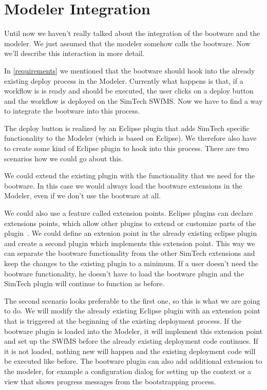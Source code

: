 \section{Modeler Integration}
\label{eclipse}

Until now we haven't really talked about the integration of the bootware and the modeler.
We just assumed that the modeler somehow calls the bootware.
Now we'll describe this interaction in more detail.

In \autoref{requirements} we mentioned that the bootware should hook into the already existing deploy process in the Modeler.
Currently what happens is that, if a workflow is is ready and should be executed, the user clicks on a deploy button and the workflow is deployed on the SimTech SWfMS.
Now we have to find a way to integrate the bootware into this process.

The deploy button is realized by an Eclipse plugin that adds SimTech specific functionality to the Modeler (which is based on Eclipse).
We therefore also have to create some kind of Eclipse plugin to hook into this process.
There are two scenarios how we could go about this.

We could extend the existing plugin with the functionality that we need for the bootware.
In this case we would always load the bootware extensions in the Modeler, even if we don't use the bootware at all.

We could also use a feature called extension points.
Eclipse plugins can declare extensions points, which allow other plugins to extend or customize parts of the plugin~\autocite{extensionpoints}.
We could define an extenion point in the already existing eclipse plugin and create a second plugin which implements this extension point.
This way we can separate the bootware functionality from the other SimTech extensions and keep the changes to the existing plugin to a minimum.
If a user doesn't need the bootware functionality, he doesn't have to load the bootware plugin and the SimTech plugin will continue to function as before.

The second scenario looks preferable to the first one, so this is what we are going to do.
We will modify the already existing Eclipse plugin with an extension point that is triggered at the beginning of the existing deployment process.
If the bootware plugin is loaded into the Modeler, it will implement this extension point and set up the SWfMS before the already existing deployment code continues.
If it is not loaded, nothing new will happen and the existing deployment code will be executed like before.
The bootware plugin can also add additional extension to the modeler, for example a configuration dialog for setting up the context or a view that shows progress messages from the bootstrapping process.
